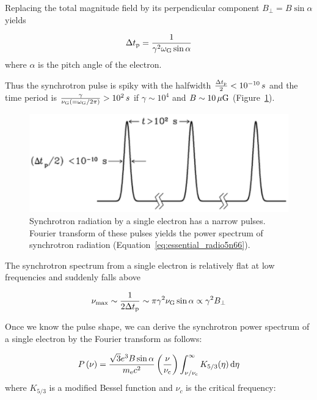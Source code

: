 Replacing the total magnitude field by its perpendicular component $B_{\perp} = B\sin\alpha$ yields

\begin{equation}\label{eq:essential_radio5n60}
    \Delta t_{\mathrm{p}} = \frac{1}{\gamma^2 \omega_{\mathrm{G}} \sin \alpha}
\end{equation}
where $\alpha$ is the pitch angle of the electron.

Thus the synchrotron pulse is spiky with the halfwidth $\frac{\Delta t_{\mathrm{p}}}{2} < 10^{-10}\,s$ and the time period is $\frac{\gamma}{\nu_{\mathrm{G}} \left(=\omega_{\mathrm{G}} / 2\pi\right)} > 10^2\,s$ if $\gamma \sim 10^4$ and $B \sim 10\,\mathrm{\mu G}$ (Figure~\ref{fig:nrao_radio5n5}).

\begin{figure}[htbp]
	\centering
	\includegraphics[width=.7\linewidth]{Chapter_2/Figures/NRAO_radio5n5.png}
    \caption[Synchrotron pulse by a single electron]{\label{fig:nrao_radio5n5}
        Synchrotron radiation by a single electron has a narrow pulses.
        Fourier transform of these pulses yields the power spectrum of synchrotron radiation (Equation~\ref{eq:essential_radio5n66}).
    }
\end{figure}


The synchrotron spectrum from a single electron is relatively flat at low frequencies and suddenly falls above

\begin{equation}\label{eq:essential_radio5n65}
    \nu_{\max} \sim \frac{1}{2 \Delta t_{\mathrm{p}}} \sim \pi \gamma^2 \nu_{\mathrm{G}} \sin \alpha \propto \gamma^2 B_{\perp}
\end{equation}

Once we know the pulse shape, we can derive the synchrotron power spectrum of a single electron by the Fourier transform as follows:

\begin{equation}\label{eq:essential_radio5n66}
    P\left(\nu\right) = \frac{\sqrt{3} e^3 B \sin \alpha}{m_{\mathrm{e}} c^2}\left(\frac{\nu}{\nu_{\mathrm{c}}}\right) \int_{\nu / \nu_{\mathrm{c}}}^{\infty} K_{5/3}(\eta)\,\mathrm{d}\eta
\end{equation}
 where $K_{5/3}$ is a modified Bessel function and $\nu_c$ is the critical frequency:

